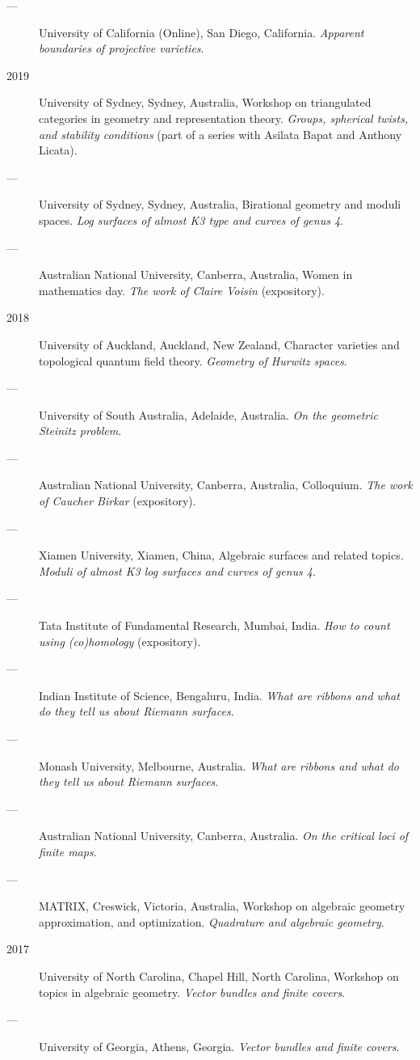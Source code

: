 \documentclass[11pt]{article}
\begin{document}
\begin{description}
\item[{---}] University of California (Online), San Diego, California. \emph{Apparent boundaries of projective varieties}.
\item[{2019}] University of Sydney, Sydney, Australia, Workshop on triangulated categories in geometry and representation theory. \emph{Groups, spherical twists, and stability conditions} (part of a series with Asilata Bapat and Anthony Licata).
\item[{---}] University of Sydney, Sydney, Australia, Birational geometry and moduli spaces. \emph{Log surfaces of almost K3 type and curves of genus 4}.
\item[{---}] Australian National University, Canberra, Australia, Women in mathematics day. \emph{The work of Claire Voisin} (expository).
\item[{2018}] University of Auckland, Auckland, New Zealand, Character varieties and topological quantum field theory. \emph{Geometry of Hurwitz spaces}.
\item[{---}] University of South Australia, Adelaide, Australia. \emph{On the geometric Steinitz problem}.
\item[{---}] Australian National University, Canberra, Australia, Colloquium. \emph{The work of Caucher Birkar} (expository).
\item[{---}] Xiamen University, Xiamen, China, Algebraic surfaces and related topics. \emph{Moduli of almost K3 log surfaces and curves of genus 4}.
\item[{---}] Tata Institute of Fundamental Research, Mumbai, India. \emph{How to count using (co)homology} (expository).
\item[{---}] Indian Institute of Science, Bengaluru, India. \emph{What are ribbons and what do they tell us about Riemann surfaces}.
\item[{---}] Monash University, Melbourne, Australia. \emph{What are ribbons and what do they tell us about Riemann surfaces}.
\item[{---}] Australian National University, Canberra, Australia. \emph{On the critical loci of finite maps}.
\item[{---}] MATRIX, Creswick, Victoria, Australia, Workshop on algebraic geometry approximation, and optimization. \emph{Quadrature and algebraic geometry}.
\item[{2017}] University of North Carolina, Chapel Hill, North Carolina, Workshop on topics in algebraic geometry. \emph{Vector bundles and finite covers}.
\item[{---}] University of Georgia, Athens, Georgia. \emph{Vector bundles and finite covers}.

\end{description}
\end{document}
